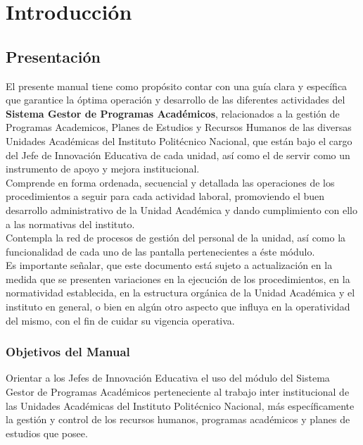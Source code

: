 \chapter{Introducción}
\section{Presentación}
El presente manual tiene como propósito contar con una guía clara y específica que garantice la óptima operación y desarrollo de las diferentes actividades del \textbf{Sistema Gestor de Programas Académicos}, relacionados a la gestión de Programas Academicos, Planes de Estudios y Recursos Humanos de las diversas Unidades Académicas del Instituto Politécnico Nacional, que están bajo el cargo del Jefe de Innovación Educativa de cada unidad, así como el de servir como un instrumento de apoyo y mejora institucional.\\

Comprende en forma ordenada, secuencial y detallada las operaciones de los procedimientos a seguir para cada actividad laboral, promoviendo el buen desarrollo administrativo de la Unidad Académica y dando cumplimiento con ello a las normativas del instituto.\\

Contempla la red de procesos de gestión del personal de la unidad, así como la funcionalidad de cada uno de las pantalla pertenecientes a éste módulo.\\

Es importante señalar, que este documento está sujeto a actualización en la medida que se presenten variaciones en la ejecución de los procedimientos, en la normatividad establecida, en la estructura orgánica de la Unidad Académica y el instituto en general, o bien en algún otro aspecto que influya en la operatividad del mismo, con el fin de cuidar su vigencia operativa.\\

    \subsection{Objetivos del Manual}
     Orientar a los Jefes de Innovación Educativa el uso del módulo del Sistema Gestor de Programas Académicos perteneciente al trabajo inter institucional de las Unidades Académicas del Instituto Politécnico Nacional, más específicamente la gestión y control de los recursos humanos, programas académicos y planes de estudios que posee.
    
